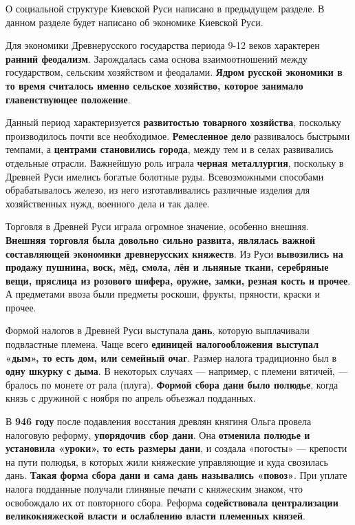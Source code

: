 \documentclass{article}
\begin{document}
О социальной структуре Киевской Руси написано в предыдущем разделе. В данном разделе будет написано об экономике Киевской Руси.

\hfill

Для экономики Древнерусского государства периода 9-12 веков характерен \textbf{ранний феодализм}.
Зарождалась сама основа взаимоотношений между государством, сельским хозяйством и
феодалами. \textbf{Ядром русской экономики в то время считалось именно сельское хозяйство,
которое занимало главенствующее положение}.

Данный период характеризуется \textbf{развитостью товарного хозяйства}, поскольку производилось
почти все необходимое. \textbf{Ремесленное дело} развивалось быстрыми темпами, а \textbf{центрами
становились города}, между тем и в селах развивались отдельные отрасли. Важнейшую роль
играла \textbf{черная металлургия}, поскольку в Древней Руси имелись богатые болотные руды.
Всевозможными способами обрабатывалось железо, из него изготавливались различные
изделия для хозяйственных нужд, военного дела и так далее.

\hfill

Торговля в Древней Руси играла огромное значение, особенно внешняя. \textbf{Внешняя торговля была довольно сильно развита, являлась важной составляющей экономики древнерусских княжеств}. Из Руси \textbf{вывозились на продажу пушнина, воск, мёд, смола, лён и льняные ткани, серебряные вещи, пряслица из розового шифера, оружие, замки, резная кость и прочее}. А предметами ввоза были предметы роскоши, фрукты, пряности, краски и прочее.

\hfill

Формой налогов в Древней Руси выступала \textbf{дань}, которую выплачивали подвластные племена. Чаще всего \textbf{единицей налогообложения выступал «дым», то есть дом, или семейный очаг}. Размер налога традиционно был в \textbf{одну шкурку с дыма}. В некоторых случаях — например, с племени вятичей, — бралось по монете от рала (плуга). \textbf{Формой сбора дани было полюдье}, когда князь с дружиной с ноября по апрель объезжал подданных.

В \textbf{946 году} после подавления восстания древлян княгиня Ольга провела налоговую реформу, \textbf{упорядочив сбор дани}. Она \textbf{отменила полюдье и установила «уроки», то есть размеры дани}, и создала «погосты» — крепости на пути полюдья, в которых жили княжеские управляющие и куда свозилась дань. \textbf{Такая форма сбора дани и сама дань назывались «повоз»}. При уплате налога подданные получали глиняные печати с княжеским знаком, что освобождало их от повторного сбора. Реформа \textbf{содействовала централизации великокняжеской власти и ослаблению власти племенных князей}.
\end{document}
